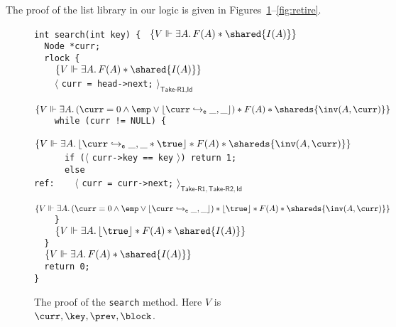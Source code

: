 The proof of the list library in our logic is given in
Figures~\ref{fig:search}--\ref{fig:retire}.
\begin{figure}[t]
\noindent%
\verb|int search(int key) { |%
\textcolor{blue}{$\{V \Vdash \exists A.\, F(A) * \shared{I(A)}\}$}\\
\verb|  Node *curr;|\\
\verb|  rlock {|\\
\verb|    |\textcolor{blue}{$\{V \Vdash \exists A.\, F(A) * \shared{I(A)}\}$}\\ 
\verb|    |$\langle$ \verb|curr = head->next;| $\rangle_{\textsf{Take-R1},\textsf{Id}}$\\
\verb|    |\textcolor{blue}{$\{V \Vdash \exists A.\,
(\curr = 0  \wedge \emp \vee \lfloor \curr \hookrightarrow_{\sf e} \_,\_\rfloor ) * 
F(A) * \shareds{\inv(A, \curr)} \}$}\\
\verb|    while (curr != NULL) {|\\
\verb|      |\textcolor{blue}{$\{V \Vdash 
\exists A.\, \lfloor \curr \hookrightarrow_{\sf e} \_,\_ *  \true \rfloor *  F(A) * 
\shareds{\inv(A, \curr)}\}$}\\
\verb|      if (|$\langle$ \verb|curr->key == key| $\rangle$\verb|) return 1;|\\
\verb|      else|\\
\verb|ref:    |$\langle$ \verb|curr = curr->next;|
$\rangle_{\textsf{Take-R1}, \textsf{Take-R2},\textsf{Id}}$\\
\verb|        |\textcolor{blue}{$\{V \Vdash 
\exists A.\, (\curr = 0 \wedge \emp \vee \lfloor \curr \hookrightarrow_{\sf e}
\_,\_ \rfloor) * \lfloor \true
\rfloor *   F(A) * \shareds{\inv(A, \curr)}\}$}\\ 
\verb|    }|\\
\verb|    |\textcolor{blue}{$\{V \Vdash \exists A.\, \lfloor \true \rfloor *  
F(A) * \shared{I(A)}\}$}\\ 
\verb|  }|\\
\verb|  |\textcolor{blue}{$\{V \Vdash \exists A.\,  F(A) * \shared{I(A)}\}$}\\
\verb|  return 0;|\\
\verb|}|
\caption{The proof of the {\tt search} method. Here $V$ is $\curr, \key, \prev, \block$.}
\label{fig:search}
\end{figure}
